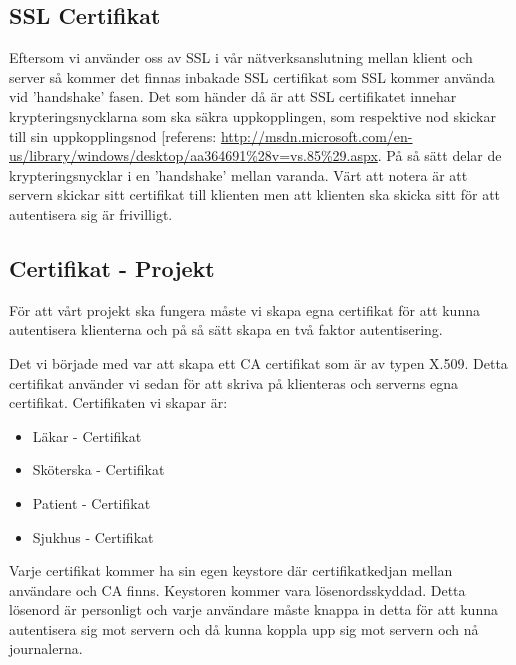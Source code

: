 \subsection{SSL Certifikat}
Eftersom vi använder oss av SSL i vår nätverksanslutning mellan klient och server så kommer det finnas inbakade SSL certifikat som SSL kommer använda vid 'handshake' fasen. Det som händer då är att SSL certifikatet innehar krypteringsnycklarna som ska säkra uppkopplingen, som respektive nod skickar till sin uppkopplingsnod [referens: \url{http://msdn.microsoft.com/en-us/library/windows/desktop/aa364691%28v=vs.85%29.aspx}. På så sätt delar de krypteringsnycklar i en 'handshake' mellan varanda. Värt att notera är att servern skickar sitt certifikat till klienten men att klienten ska skicka sitt för att autentisera sig är frivilligt.

\subsection{Certifikat - Projekt}
För att vårt projekt ska fungera måste vi skapa egna certifikat för att kunna autentisera klienterna och på så sätt skapa en två faktor autentisering. 

Det vi började med var att skapa ett CA certifikat som är av typen X.509. Detta certifikat använder vi sedan för att skriva på klienteras och serverns egna certifikat. Certifikaten vi skapar är:

\begin{itemize}
\item{Läkar - Certifikat}
\item{Sköterska - Certifikat}
\item{Patient - Certifikat}
\item{Sjukhus - Certifikat}
\end{itemize}

Varje certifikat kommer ha sin egen keystore där certifikatkedjan mellan användare och CA finns. Keystoren kommer vara lösenordsskyddad. Detta lösenord är personligt och varje användare måste knappa in detta för att kunna autentisera sig mot servern och då kunna koppla upp sig mot servern och nå journalerna. 